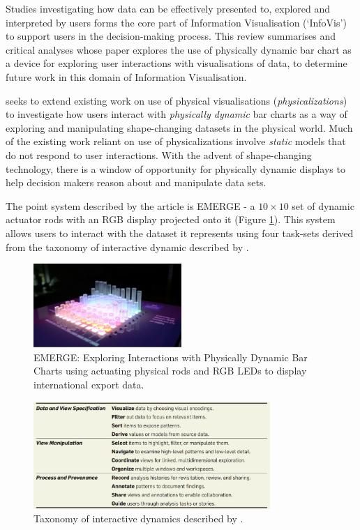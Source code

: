 \documentclass[11pt]{article}
\begin{document}

Studies investigating how data can be effectively presented to, explored and interpreted by users forms the core part of Information Visualisation (`InfoVis') to support users in the decision-making process. This review summarises and critical analyses \citet{taher2015} whose paper explores the use of physically dynamic bar chart as a device for exploring user interactions with visualisations of data, to determine future work in this domain of Information Visualisation.

\citeauthor{taher2015} seeks to extend existing work on use of physical visualisations (\textit{physicalizations}) to investigate how users interact with \textit{physically dynamic} bar charts as a way of exploring and manipulating shape-changing datasets in the physical world. Much of the existing work reliant on use of physicalizations involve \textit{static} models that do not respond to user interactions. With the advent of shape-changing technology, there is a window of opportunity for physically dynamic displays to help decision makers reason about and manipulate data sets.

The point system described by the article is EMERGE - a $10\times10$ set of dynamic actuator rods with an RGB display projected onto it (Figure \ref{fig:taher2015-emerge}). This system allows users to interact with the dataset it represents using four task-sets derived from the taxonomy of interactive dynamic described by \citet{heer2012}.

\begin{figure}[H]
\centering
\includegraphics[width=0.5\textwidth]{img/taher2015-emerge.png} 
\caption{EMERGE: Exploring Interactions with Physically Dynamic Bar Charts using actuating physical rods and RGB LEDs to display international export data.}\label{fig:taher2015-emerge}
\end{figure}

\begin{figure}[H]
\centering
\includegraphics[width=0.8\textwidth]{img/heer2012-taxonomy.png} 
\caption{Taxonomy of interactive dynamics described by \protect\citet{heer2012}.}\label{fig:heer2012-taxonomy}
\end{figure}
\end{document}
